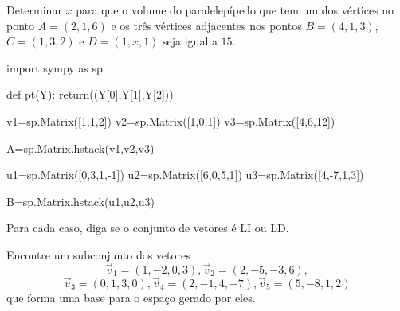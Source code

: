 \question 	Determinar $x$ para que o volume do paralelepípedo que tem um dos vértices no ponto $A=(2,1,6)$ e os três vértices adjacentes nos pontos $B=(4,1,3)$, $C=(1,3,2)$ e $D=(1,x,1)$ seja igual a $15$.


\begin{pycode}
import sympy as sp

def pt(Y):
 return((Y[0],Y[1],Y[2]))

v1=sp.Matrix([1,1,2])
v2=sp.Matrix([1,0,1])
v3=sp.Matrix([4,6,12])

A=sp.Matrix.hstack(v1,v2,v3)


u1=sp.Matrix([0,3,1,-1])
u2=sp.Matrix([6,0,5,1])
u3=sp.Matrix([4,-7,1,3])

B=sp.Matrix.hstack(u1,u2,u3)
\end{pycode}

\question Para cada caso, diga se o conjunto de vetores é LI ou LD.


\begin{solution}
\end{solution}


\question Encontre um subconjunto dos vetores 
\[\vec{v}_1=(1,-2,0,3), \vec{v}_2=(2,-5,-3,6),
\]
\[\vec{v}_3=(0,1,3,0), \vec{v}_4=(2,-1,4,-7), \vec{v}_5=(5,-8,1,2)
\]
que forma uma base para o espaço gerado por eles.

